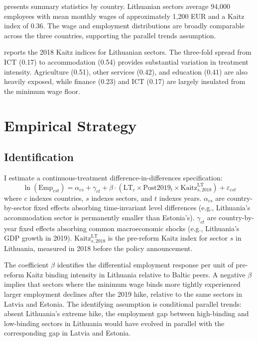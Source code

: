 \documentclass[12pt]{article}
\begin{document}


 presents summary statistics by country. Lithuanian sectors average 94,000 employees with mean monthly wages of approximately 1,200 EUR and a Kaitz index of 0.36. The wage and employment distributions are broadly comparable across the three countries, supporting the parallel trends assumption.



 reports the 2018 Kaitz indices for Lithuanian sectors. The three-fold spread from ICT (0.17) to accommodation (0.54) provides substantial variation in treatment intensity. Agriculture (0.51), other services (0.42), and education (0.41) are also heavily exposed, while finance (0.23) and ICT (0.17) are largely insulated from the minimum wage floor.

\section{Empirical Strategy}

\subsection{Identification}

I estimate a continuous-treatment difference-in-differences specification:
\begin{equation}
\ln(\text{Emp}_{cst}) = \alpha_{cs} + \gamma_{ct} + \beta \cdot (\text{LT}_c \times \text{Post2019}_t \times \text{Kaitz}_{s,2018}^{\text{LT}}) + \varepsilon_{cst}
\label{eq:main}
\end{equation}
where $c$ indexes countries, $s$ indexes sectors, and $t$ indexes years. $\alpha_{cs}$ are country-by-sector fixed effects absorbing time-invariant level differences (e.g., Lithuania's accommodation sector is permanently smaller than Estonia's). $\gamma_{ct}$ are country-by-year fixed effects absorbing common macroeconomic shocks (e.g., Lithuania's GDP growth in 2019). $\text{Kaitz}_{s,2018}^{\text{LT}}$ is the pre-reform Kaitz index for sector $s$ in Lithuania, measured in 2018 before the policy announcement.

The coefficient $\beta$ identifies the differential employment response per unit of pre-reform Kaitz binding intensity in Lithuania relative to Baltic peers. A negative $\beta$ implies that sectors where the minimum wage binds more tightly experienced larger employment declines after the 2019 hike, relative to the same sectors in Latvia and Estonia. The identifying assumption is conditional parallel trends: absent Lithuania's extreme hike, the employment gap between high-binding and low-binding sectors in Lithuania would have evolved in parallel with the corresponding gap in Latvia and Estonia.
\end{document}
